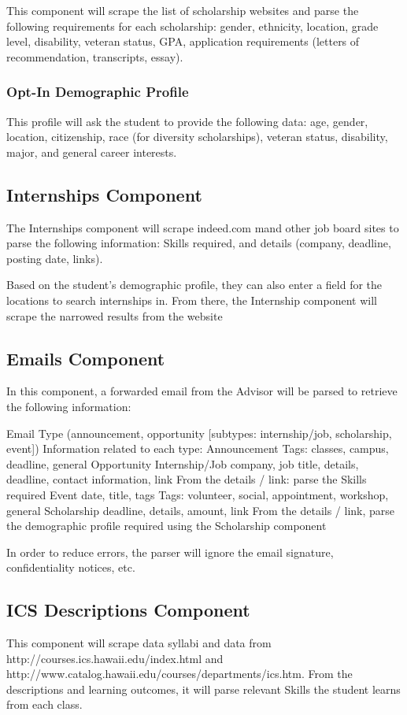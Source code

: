\documentclass[english]{proposalnsf}
\begin{document}
	This component will scrape the list of scholarship websites and parse the following requirements for each scholarship: gender, ethnicity, location, grade level, disability, veteran status, GPA, application requirements (letters of recommendation, transcripts, essay).
	
	\subsubsection{Opt-In Demographic Profile}
	This profile will ask the student to provide the following data: age, gender, location, citizenship, race (for diversity scholarships), veteran status, disability, major, and general career interests.
	
	
	\subsection{Internships Component}
	The Internships component will scrape indeed.com mand other job board sites to parse the following information: Skills required, and details (company, deadline, posting date, links).
	
	Based on the student’s demographic profile, they can also enter a field for the locations to search internships in. From there, the Internship component will scrape the narrowed results from the website
	
	\subsection{Emails Component}
	In this component, a forwarded email from the Advisor will be parsed to retrieve the following information:
	\begin{outline}
		\1 Email Type
		\2 (announcement, opportunity [subtypes: internship/job, scholarship, event])
		\1 Information related to each type:
		\2 Announcement
		\3 Tags: classes, campus, deadline, general
		\2 Opportunity
		\3 Internship/Job
		\4 company, job title, details, deadline, contact information, link
		\5 From the details / link: parse the Skills required
		\3 Event
		\4 date, title, tags
		\4 Tags: volunteer, social, appointment, workshop, general
		\3 Scholarship
		\4 deadline, details, amount, link
		\5 From the details / link, parse the demographic profile required using the Scholarship component
	\end{outline}
	In order to reduce errors, the parser will ignore the email signature, confidentiality notices, etc.
	
	
	\subsection{ICS Descriptions Component}
	This component will scrape data syllabi and data from http://courses.ics.hawaii.edu/index.html and http://www.catalog.hawaii.edu/courses/departments/ics.htm. From the descriptions and learning outcomes, it will parse relevant Skills the student learns from each class.
	
\end{document}
